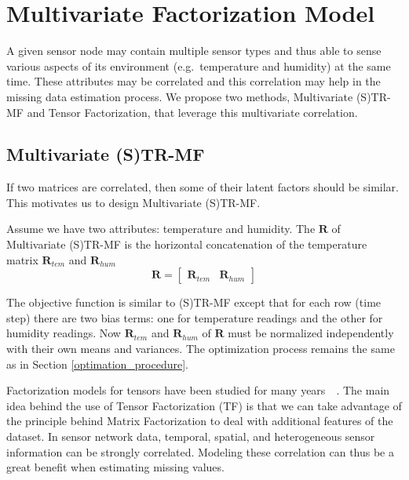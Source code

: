 
\section{Multivariate Factorization Model} \label{sec:tf}
A given sensor node may contain multiple sensor types and thus able to sense various aspects of its environment (e.g.\ temperature and humidity) at the same time.
These attributes may be correlated and this correlation may help in the missing data estimation process.
We propose two methods, Multivariate (S)TR-MF and Tensor Factorization, that leverage this multivariate correlation.

\subsection{Multivariate (S)TR-MF} %
If two matrices are correlated, then some of their latent factors should be similar.
This motivates us to design Multivariate (S)TR-MF.

Assume we have two attributes: temperature and humidity.
The $\mathbf{R}$ of Multivariate (S)TR-MF is the horizontal concatenation of the temperature matrix $\mathbf{R}_{tem}$ and $\mathbf{R}_{hum}$
\begin{equation*} \mathbf{R} = \begin{bmatrix}\mathbf{R}_{tem} & \mathbf{R}_{hum} \end{bmatrix} \end{equation*}

The objective function is similar to (S)TR-MF except that for each row (time step) there are two bias terms: one for temperature readings and the other for humidity readings.
Now $\mathbf{R}_{tem}$ and $\mathbf{R}_{hum}$ of $\mathbf{R}$ must be normalized independently with their own means and variances.
The optimization process remains the same as in Section \ref{optimation_procedure}.

Factorization models for tensors have been studied for many years~\cite{tg2009td}~\cite{bergqvist2010hosvd}. The main idea behind the use of Tensor Factorization (TF) is that we can take advantage of the principle behind Matrix Factorization to deal with additional features of the dataset. In sensor network data, temporal, spatial, and heterogeneous sensor information can be strongly correlated.
Modeling these correlation can thus be a great benefit when estimating missing values.
 
